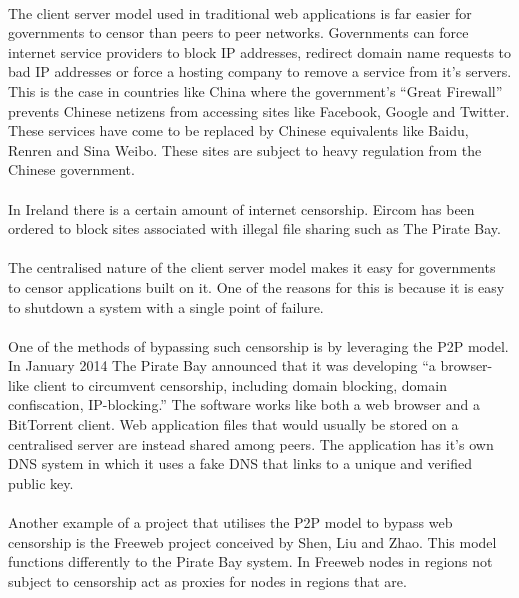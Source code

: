 \documentclass[11pt]{amsart}
\begin{document}
\paragraph{}
The client server model used in traditional web applications is far easier for governments to censor than peers to peer networks. Governments can force internet service providers to block IP addresses, redirect domain name requests to bad IP addresses or force a hosting company to remove a service from it's servers. This is the case in countries like China where the government's ``Great Firewall'' prevents Chinese netizens from accessing sites like Facebook, Google and Twitter. These services have come to be replaced by Chinese equivalents like Baidu, Renren and Sina Weibo. These sites are subject to heavy regulation from the Chinese government. 
\paragraph{}
In Ireland there is a certain amount of internet censorship. Eircom has been ordered to block sites associated with illegal file sharing such as The Pirate Bay.
\paragraph{}
The centralised nature of the client server model makes it easy for governments to censor applications built on it. One of the reasons for this is because it is easy to shutdown a system with a single point of failure.
\paragraph{}
One of the methods of bypassing such censorship is by leveraging the P2P model. In January 2014 The Pirate Bay announced that it was developing ``a browser-like client to circumvent censorship, including domain blocking, domain confiscation, IP-blocking.'' The software works like both a web browser and a BitTorrent client. Web application files that would usually be stored on a centralised server are instead shared among peers. The application has it's own DNS system in which it uses a fake DNS that links to a unique and verified public key.\cite{PirateBayBrowser}
\paragraph{}
Another example of a project that utilises the P2P model to bypass web censorship is the Freeweb project conceived by Shen, Liu and Zhao.\cite{FreeWeb} This model functions differently to the Pirate Bay system. In Freeweb nodes in regions not subject to censorship act as proxies for nodes in regions that are. 
\end{document}
